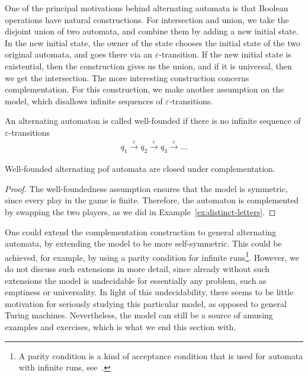One of the principal motivations behind alternating automata is that Boolean operations have natural constructions.  For intersection and union, we take the disjoint union of two automata, and combine them by adding a new initial state. In the new initial state,  the owner of the state chooses the initial state of the  two original automata, and goes there via an $\varepsilon$-transition. If the new initial state is existential, then the construction gives us the union, and if it is universal, then we get the intersection. The more interesting construction concerns complementation. 
For this construction, we make another assumption on the model, which  disallows infinite sequences of $\varepsilon$-transitions.

\begin{definition}
	\label{def:well-founded}
	An alternating automaton is called well-founded if there is no infinite sequence of $\varepsilon$-transitions 
	\begin{align*}
	q_1 \stackrel \varepsilon \to q_2 \stackrel \varepsilon \to q_3 \stackrel \varepsilon \to \ldots
	\end{align*}
\end{definition}
\begin{theorem}
	Well-founded alternating pof automata are closed under complementation.
\end{theorem}
\begin{proof} The well-foundedness assumption ensures that the model is symmetric, since every play in the game is finite. Therefore, the automaton is complemented by swapping the two players, as  we did in Example~\ref{ex:distinct-letters}. 
\end{proof}


One could extend the complementation construction to general alternating automata, by extending the model to be more self-symmetric. This could be achieved, for example, by using a parity condition for infinite runs\footnote{A parity condition is a kind of acceptance condition that is used for automata with infinite runs, see~\cite[Section 5]{DBLP:reference/hfl/Thomas97}. }. However, we do not discuss such extensions in more detail, since already without such extensions the model is undecidable for essentially any problem, such as  emptiness or universality. In light of this undecidability, there seems to be little motivation for seriously studying this particular model, as opposed to general Turing machines. 
Nevertheless, the model can still be a source of amusing examples and exercises, which is what we end this section with.


